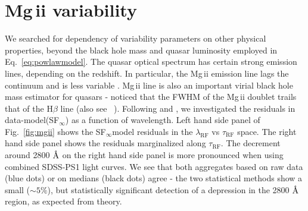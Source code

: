 \documentclass[twocolumn]{aastex62}
\let\oldAA\AA
\renewcommand{\AA}{\text{\normalfont\oldAA}}
\begin{document}
\begin{figure*} 
	\caption{Outliers in the space of recovered DRW parameters between SDSS and SDSS-PS1, as well as median offsets. Page 1.}
	\label{fig:clqso1}
\end{figure*}

\begin{figure*}
\caption{As Fig.~\ref{fig:clqso1}, page 2. }
\label{fig:clqso2}
\end{figure*}


\begin{figure*}
\caption{As Fig.~\ref{fig:clqso1}, page 3. }
\label{fig:clqso3}
\end{figure*}

\begin{figure*}
\caption{As Fig.~\ref{fig:clqso1}, page 4. }
\label{fig:clqso4}
\end{figure*}





\section{Mg\,{\sc ii} variability}
\label{app:mgii_variability}
We searched for dependency of variability parameters on other physical properties, beyond the black hole mass and quasar luminosity employed in Eq.~\ref{eq:powlawmodel}. The quasar optical spectrum has certain strong emission lines, depending on the redshift. In particular, the Mg\,{\sc ii} emission line lags the continuum and is less variable \citep{reichert1994}. Mg\,{\sc ii} line  is also an important virial black hole mass estimator for quasars - \cite{mclure2002} noticed that the FWHM of the Mg\,{\sc ii} doublet trails that of the  H$\beta$ line (also see ~\citealt{shen2013}). Following  \cite{ivezic2004} and \cite{macleod2012},  we investigated the residuals in data-model(SF$_{\infty}$) as a function of wavelength. Left hand side panel of Fig.~\ref{fig:mgii} shows the SF$_{\infty}$model residuals in the $\lambda_{\mathrm{RF}}$ vs $\tau_{\mathrm{RF}}$ space. The right hand side panel shows the residuals marginalized along $\tau_{\mathrm{RF}}$. The decrement around 2800 $\mbox{\AA}$ on the right hand side panel is more pronounced when using combined SDSS-PS1 light curves. We see that both aggregates based on raw data (blue dots) or on medians (black dots) agree - the two statistical methods show a small ($\sim5\%$), but statistically significant detection of a depression in the 2800 $\mbox{\AA}$  region, as expected from theory.
\end{document}
